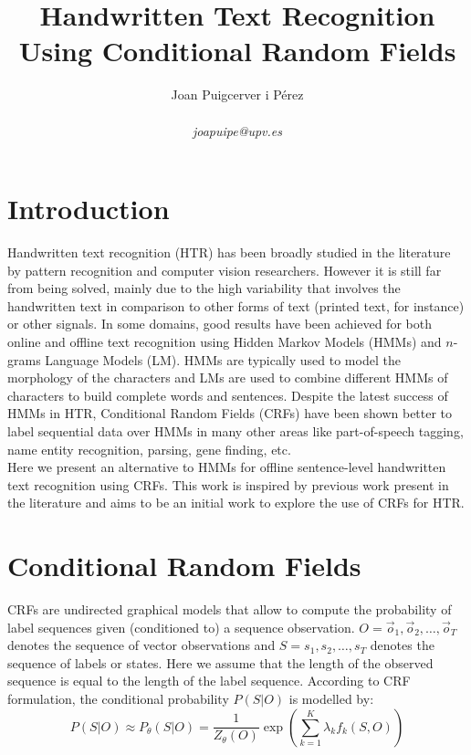 \documentclass[10pt,a4paper]{article}
\author{Joan Puigcerver i Pérez\\
\begin{footnotesize}
\emph{joapuipe@upv.es}
\end{footnotesize}}
\title{Handwritten Text Recognition Using Conditional Random Fields}
\begin{document}
\maketitle

\section{Introduction}
Handwritten text recognition (HTR) has been broadly studied in the literature by pattern recognition and computer vision researchers. However it is still far from being solved, mainly due to the high variability that involves the handwritten text in comparison to other forms of text (printed text, for instance) or other signals. In some domains, good results have been achieved for both online and offline text recognition using Hidden Markov Models (HMMs) and $n$-grams Language Models (LM). HMMs are typically used to model the morphology of the characters and LMs are used to combine different HMMs of characters to build complete words and sentences. Despite the latest success of HMMs in HTR, Conditional Random Fields (CRFs)\cite{lafferty2001conditional} have been shown better to label sequential data over HMMs in many other areas like part-of-speech tagging, name entity recognition, parsing, gene finding, etc.\\

Here we present an alternative to HMMs for offline sentence-level handwritten text recognition using CRFs. This work is inspired by previous work present in the literature\cite{feng2006exploring} and aims to be an initial work to explore the use of CRFs for HTR.

\section{Conditional Random Fields}
CRFs are undirected graphical models that allow to compute the probability of label sequences given (conditioned to) a sequence observation. $O = \vec{o}_1, \vec{o}_2, \ldots, \vec{o}_T$ denotes the sequence of vector observations and $S = s_1, s_2, \ldots, s_T$ denotes the sequence of labels or states. Here we assume that the length of the observed sequence is equal to the length of the label sequence. According to CRF formulation, the conditional probability $P(S|O)$ is modelled by:\\

\begin{equation}\label{eq:general_crf}
P(S|O) \approx P_\theta(S|O) = \frac{1}{Z_\theta(O)} \exp \left( \sum_{k=1}^K \lambda_k f_k(S,O) \right)
\end{equation}
\end{document}
